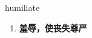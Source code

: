 
\begin{frame}
{\huge humiliate}
\begin{center}
\begin{enumerate}\Large
  \item \textbf{羞辱，使丧失尊严}
\end{enumerate}
\end{center}
\end{frame}
